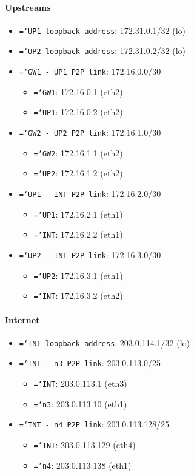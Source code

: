 \documentclass{report}
\newcommand{\monospaced}[1]{\texttt{\hyphenchar\font=`\-#1}}
\begin{document}
\paragraph{Upstreams}
\begin{itemize}
    \item \monospaced{UP1 loopback address}: 172.31.0.1/32 (lo)
    \item \monospaced{UP2 loopback address}: 172.31.0.2/32 (lo)
    \item \monospaced{GW1 - UP1 P2P link}: 172.16.0.0/30
    \begin{itemize}
        \item \monospaced{GW1}: 172.16.0.1 (eth2)
        \item \monospaced{UP1}: 172.16.0.2 (eth2)
    \end{itemize}
    \item \monospaced{GW2 - UP2 P2P link}: 172.16.1.0/30
    \begin{itemize}
        \item \monospaced{GW2}: 172.16.1.1 (eth2)
        \item \monospaced{UP2}: 172.16.1.2 (eth2)
    \end{itemize}
    \item \monospaced{UP1 - INT P2P link}: 172.16.2.0/30
    \begin{itemize}
        \item \monospaced{UP1}: 172.16.2.1 (eth1)
        \item \monospaced{INT}: 172.16.2.2 (eth1)
    \end{itemize}
    \item \monospaced{UP2 - INT P2P link}: 172.16.3.0/30
    \begin{itemize}
        \item \monospaced{UP2}: 172.16.3.1 (eth1)
        \item \monospaced{INT}: 172.16.3.2 (eth2)
    \end{itemize}
\end{itemize}
\paragraph{Internet}
\begin{itemize}
    \item \monospaced{INT loopback address}: 203.0.114.1/32 (lo)
    \item \monospaced{INT - n3 P2P link}: 203.0.113.0/25
    \begin{itemize}
        \item \monospaced{INT}: 203.0.113.1 (eth3)
        \item \monospaced{n3}: 203.0.113.10 (eth1)
    \end{itemize}
    \item \monospaced{INT - n4 P2P link}: 203.0.113.128/25
    \begin{itemize}
        \item \monospaced{INT}: 203.0.113.129 (eth4)
        \item \monospaced{n4}: 203.0.113.138 (eth1)
    \end{itemize}
\end{itemize}
\end{document}
